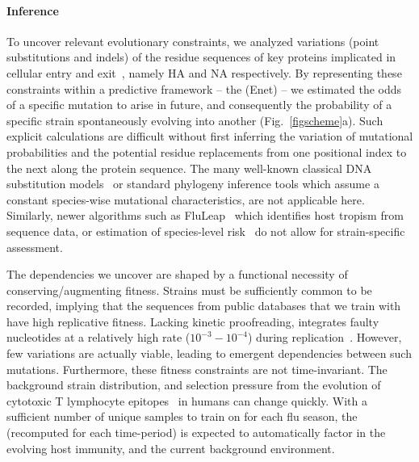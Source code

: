 \documentclass[onecolumn, compsoc,12pt]{IEEEtran}
\begin{document}
\paragraph*{\enet Inference}

To uncover relevant evolutionary constraints, we analyzed  variations (point substitutions and indels) of the  residue  sequences  of key proteins implicated  in cellular entry and exit~\cite{gamblin2010influenza,shao2017evolution}, namely HA and NA respectively. By representing these constraints within a predictive framework -- the \enet (Enet) -- we estimated the  odds of a specific mutation to arise in future, and consequently the probability of a specific strain spontaneously  evolving into another (Fig.~\ref{figscheme}a).  Such explicit calculations are difficult  without first inferring the variation of mutational probabilities and the potential residue replacements from one positional index to the next along the protein sequence. The many well-known classical  DNA  substitution models~\cite{posada1998modeltest} or standard phylogeny inference tools which assume a constant species-wise mutational characteristics,  are not applicable here. Similarly, newer algorithms such  as FluLeap~\cite{eng2014predicting}  which identifies host tropism from sequence data, or estimation of species-level risk~\cite{grange2021ranking} do not allow for strain-specific assessment.

The dependencies we uncover are shaped by  a  functional necessity of conserving/augmenting  fitness. Strains must be sufficiently common  to be recorded, implying that the sequences from public databases that we train  with have  high replicative fitness. Lacking kinetic proofreading, \infl integrates  faulty nucleotides   at a relatively high rate ($10^{-3}-10^{-4}$) during  replication~\cite{ahlquist2002rna,chen2006avian}. However, few variations are actually viable, leading to emergent dependencies between such mutations. Furthermore, these fitness constraints are not time-invariant. The background strain distribution, and selection pressure from the evolution of cytotoxic T lymphocyte  epitopes~\cite{woolthuis2016long,fan2012role,van2016differential,berkhoff2007assessment,van2012evasion} in humans can change quickly. With a sufficient number of unique samples to train on for each flu season, the \enet (recomputed for each time-period) is expected to automatically factor in the evolving host immunity, and the current background environment.  
\end{document}
